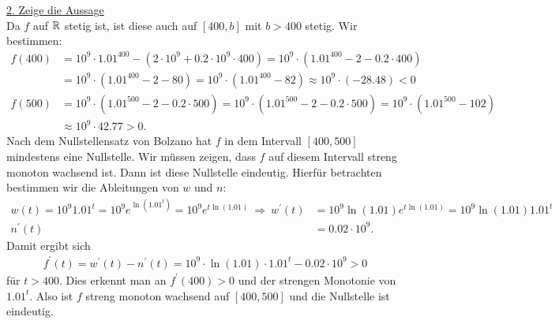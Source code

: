 \underline{2. Zeige die Aussage}\\
Da $ f $ auf $ \mathbb{R} $ stetig ist, ist diese auch auf $ [400, b] $ mit $ b > 400 $ stetig.
Wir bestimmen:
\begin{align*}
	f(400) &= 10^9 \cdot 1.01^{ 400} - (2 \cdot 10^9 + 0.2 \cdot 10^9 \cdot 400 )
	= 10^9 \cdot (1.01^{ 400} - 2 - 0.2 \cdot 400)\\
	&= 10^9 \cdot (1.01^{ 400} - 2 - 80) 
	=  10^9 \cdot (1.01^{ 400} -82) 
	\approx 10^9 \cdot (- 28.48) < 0\\
	f(500) &= 10^9 \cdot (1.01^{ 500} - 2 - 0.2 \cdot 500)
	 = 10^9 \cdot (1.01^{ 500} - 2 - 0.2 \cdot 500)
	= 10^9 \cdot (1.01^{ 500} - 102)\\
	&\approx 10^9 \cdot 42.77 > 0.
\end{align*}
Nach dem Nullstellensatz von Bolzano hat $ f $ in dem Intervall $ [400,500] $  mindestens eine Nullstelle. Wir müssen zeigen, dass $ f  $ auf diesem Intervall streng monoton wachsend ist. Dann ist diese Nullstelle eindeutig.
Hierfür betrachten bestimmen wir die Ableitungen von $ w $ und $ n $:
\begin{align*}
	w(t) = 10^9 1.01^t = 10^9 e^{\ln(1.01^t)}
	=
	10^9 e^{t \ln(1.01)} \ \Rightarrow \
	w^\prime(t) &= 10^9 \ln(1.01) e^{t \ln(1.01)} = 10^9 \ln(1.01) 1.01^t\\
	n^\prime(t) &= 0.02\cdot 10^9.
\end{align*}
Damit ergibt sich
\begin{align*}
	f^\prime(t) = w^\prime(t) - n^\prime(t)
	= 
	10^9 \cdot  \ln(1.01) \cdot 1.01^t - 0.02\cdot 10^9 > 0
\end{align*}
für $ t > 400 $. 
Dies erkennt man an $ f^\prime(400) >0  $ und der strengen Monotonie von $ 1.01^t $.
Also ist $ f $ streng monoton wachsend auf $ [400,500] $ und die Nullstelle ist eindeutig.
 
\newpage


